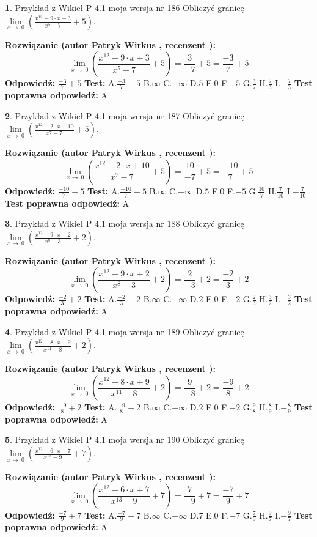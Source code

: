 \documentclass[12pt, a4paper]{article}
\theoremstyle{definition} %
\newtheorem{zad}{}
\newcommand{\zadStart}[1]{\begin{zad}#1\newline}
\newcommand{\zadStop}{\end{zad}}
\newcommand{\rozwStart}[2]{\noindent \textbf{Rozwiązanie (autor #1 , recenzent #2): }\newline}
\newcommand{\rozwStop}{\newline}
\newcommand{\odpStart}{\noindent \textbf{Odpowiedź:}\newline}
\newcommand{\odpStop}{\newline}
\newcommand{\testStart}{\noindent \textbf{Test:}\newline}
\newcommand{\testStop}{\newline}
\newcommand{\kluczStart}{\noindent \textbf{Test poprawna odpowiedź:}\newline}
\newcommand{\kluczStop}{\newline}
\begin{document}
\zadStart{Przykład z Wikieł P 4.1 moja wersja nr 186}
Obliczyć granicę $\lim\limits_{x\to\ 0}(\frac{x^{12}-9 \cdot x +3}{x^{5}-7}+5)$.
\zadStop
\rozwStart{Patryk Wirkus}{}
$$\lim\limits_{x\to\ 0}(\frac{x^{12}-9 \cdot x +3}{x^{5}-7}+5)=\frac{3}{-7}+5=\frac{-3}{7}+5$$
\rozwStop
\odpStart
$\frac{-3}{7}+5$
\odpStop
\testStart
A.$\frac{-3}{7}+5$
B.$\infty$
C.$-\infty$
D.$5$
E.$0$
F.$-5$
G.$\frac{3}{7}$
H.$\frac{7}{3}$
I.$-\frac{7}{3}$
\testStop
\kluczStart
A
\kluczStop



\zadStart{Przykład z Wikieł P 4.1 moja wersja nr 187}
Obliczyć granicę $\lim\limits_{x\to\ 0}(\frac{x^{12}-2 \cdot x +10}{x^{7}-7}+5)$.
\zadStop
\rozwStart{Patryk Wirkus}{}
$$\lim\limits_{x\to\ 0}(\frac{x^{12}-2 \cdot x +10}{x^{7}-7}+5)=\frac{10}{-7}+5=\frac{-10}{7}+5$$
\rozwStop
\odpStart
$\frac{-10}{7}+5$
\odpStop
\testStart
A.$\frac{-10}{7}+5$
B.$\infty$
C.$-\infty$
D.$5$
E.$0$
F.$-5$
G.$\frac{10}{7}$
H.$\frac{7}{10}$
I.$-\frac{7}{10}$
\testStop
\kluczStart
A
\kluczStop



\zadStart{Przykład z Wikieł P 4.1 moja wersja nr 188}
Obliczyć granicę $\lim\limits_{x\to\ 0}(\frac{x^{12}-9 \cdot x +2}{x^{8}-3}+2)$.
\zadStop
\rozwStart{Patryk Wirkus}{}
$$\lim\limits_{x\to\ 0}(\frac{x^{12}-9 \cdot x +2}{x^{8}-3}+2)=\frac{2}{-3}+2=\frac{-2}{3}+2$$
\rozwStop
\odpStart
$\frac{-2}{3}+2$
\odpStop
\testStart
A.$\frac{-2}{3}+2$
B.$\infty$
C.$-\infty$
D.$2$
E.$0$
F.$-2$
G.$\frac{2}{3}$
H.$\frac{3}{2}$
I.$-\frac{3}{2}$
\testStop
\kluczStart
A
\kluczStop



\zadStart{Przykład z Wikieł P 4.1 moja wersja nr 189}
Obliczyć granicę $\lim\limits_{x\to\ 0}(\frac{x^{12}-8 \cdot x +9}{x^{11}-8}+2)$.
\zadStop
\rozwStart{Patryk Wirkus}{}
$$\lim\limits_{x\to\ 0}(\frac{x^{12}-8 \cdot x +9}{x^{11}-8}+2)=\frac{9}{-8}+2=\frac{-9}{8}+2$$
\rozwStop
\odpStart
$\frac{-9}{8}+2$
\odpStop
\testStart
A.$\frac{-9}{8}+2$
B.$\infty$
C.$-\infty$
D.$2$
E.$0$
F.$-2$
G.$\frac{9}{8}$
H.$\frac{8}{9}$
I.$-\frac{8}{9}$
\testStop
\kluczStart
A
\kluczStop



\zadStart{Przykład z Wikieł P 4.1 moja wersja nr 190}
Obliczyć granicę $\lim\limits_{x\to\ 0}(\frac{x^{12}-6 \cdot x +7}{x^{13}-9}+7)$.
\zadStop
\rozwStart{Patryk Wirkus}{}
$$\lim\limits_{x\to\ 0}(\frac{x^{12}-6 \cdot x +7}{x^{13}-9}+7)=\frac{7}{-9}+7=\frac{-7}{9}+7$$
\rozwStop
\odpStart
$\frac{-7}{9}+7$
\odpStop
\testStart
A.$\frac{-7}{9}+7$
B.$\infty$
C.$-\infty$
D.$7$
E.$0$
F.$-7$
G.$\frac{7}{9}$
H.$\frac{9}{7}$
I.$-\frac{9}{7}$
\testStop
\kluczStart
A
\kluczStop
\end{document}
